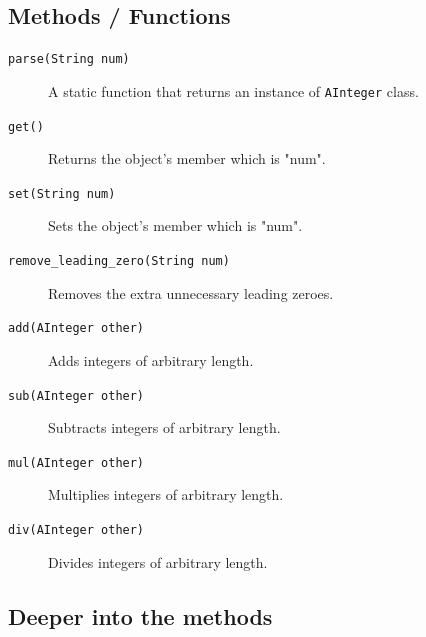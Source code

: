 \documentclass{article}
\begin{document}
\subsection*{Methods / Functions}
\begin{description}
    \item[\texttt{parse(String num)}] A static function that returns an instance of \texttt{AInteger} class.
    \item[\texttt{get()}] Returns the object's member which is "num".
    \item[\texttt{set(String num)}] Sets the object's member which is "num".
    \item[\texttt{remove\_leading\_zero(String num)}] Removes the extra unnecessary leading zeroes.
    \item[\texttt{add(AInteger other)}] Adds integers of arbitrary length.
    \item[\texttt{sub(AInteger other)}] Subtracts integers of arbitrary length.
    \item[\texttt{mul(AInteger other)}] Multiplies integers of arbitrary length.
    \item[\texttt{div(AInteger other)}] Divides integers of arbitrary length.
\end{description}

\subsection*{Deeper into the methods}
\end{document}
